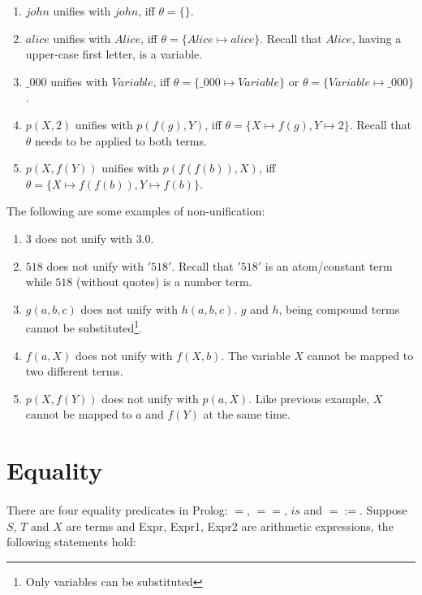 \documentclass{article}
\begin{document}
\begin{multicols}{2}
  \begin{enumerate}
  \item $john$ unifies with $john$, iff $\theta = \{\}$.
  \item $alice$ unifies with $Alice$, iff $\theta = \{Alice \mapsto alice\}$. Recall that $Alice$, having a upper-case first letter, is a variable.
  \item $\_000$ unifies with $Variable$, iff $\theta = \{\_000 \mapsto Variable\}$ or $\theta = \{Variable \mapsto \_000\}$.
  \item $p(X, 2)$ unifies with $p(f(g), Y)$, iff $\theta = \{X \mapsto f(g), Y \mapsto 2\}$. Recall that $\theta$ needs to be applied to both terms.
  \item $p(X, f(Y))$ unifies with $p(f(f(b)), X)$, iff $\theta = \{X \mapsto f(f(b)), Y \mapsto f(b)\}$.
  \end{enumerate}
  
  The following are some examples of non-unification:
  
  \begin{enumerate}
  \item $3$ does not unify with $3.0$.
  \item $518$ does not unify with $'518'$. Recall that $'518'$ is an atom/constant term while $518$ (without quotes) is a number term.
  \item $g(a, b, c)$ does not unify with $h(a, b, c)$. $g$ and $h$, being compound terms cannot be substituted\footnote{Only variables can be substituted}.
  \item $f(a, X)$ does not unify with $f(X, b)$. The variable $X$ cannot be mapped to two different terms.
  \item $p(X, f(Y))$ does not unify with $p(a, X)$. Like previous example, $X$ cannot be mapped to $a$ and $f(Y)$ at the same time.
  \end{enumerate}
  
  \section{Equality}
  
  \paragraph{} There are four equality predicates in Prolog: $=$, $==$, $is$ and $=:=$. Suppose $S$, $T$ and $X$ are terms and Expr, Expr1, Expr2 are arithmetic expressions, the following statements hold:
  

\end{multicols}
\end{document}
